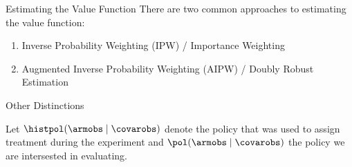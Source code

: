 \documentclass[aspectratio=169, professionalfonts]{beamer}
\begin{document}
\begin{frame}{Estimating the Value Function}
	There are two common approaches to estimating the value function:
	\begin{enumerate}
		\item Inverse Probability Weighting (IPW) / Importance Weighting

		\item Augmented Inverse Probability Weighting (AIPW) / Doubly Robust Estimation
	\end{enumerate}

\end{frame}
\begin{frame}{Other Distinctions}

	Let $\histpol(\armobs \mid \covarobs)$ denote the policy that was used to assign treatment
	during the experiment and $\pol(\armobs \mid \covarobs)$ the policy we are intersested in
	evaluating.

	\begin{columns}[T]
		\begin{column}{.5\textwidth}
		\end{column}
		\pause
		\begin{column}{.5\textwidth}
		\end{column}%
	\end{columns}


\end{frame}
\end{document}
